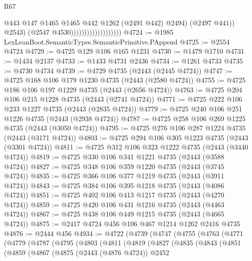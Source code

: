 \begin{lexlean}{R67}
\begin{coremodule}
                                              @443
                                              @147
                                              @1465
                                              @1465
                                              @442
                                              @1262
                                              (@2491 @442)
                                              @2494)
                                            (@2497 @441))
                                          @2543)
                                        (@2547 @4530)))))))))))))))))))
@4724 := @1985 LexLeanBoot.SemanticTypes.SemanticPrimitive.PAppend
@4725 := @2554 @4724
@4729 := @4725 @129 @106 @165 @1231
@4730 := @1479 @1710
@4731 := @1434 @2137
@4733 := @1433 @4731 @2436
@4734 := @1261 @4733
@4735 := @4730 @4734
@4739 := @4729 @4735 (@2443 (@2445 @4724))
@4747 := @4725 @168 @106 @179 @1230 @4735 (@2443 (@2580 @4724))
@4755 := @4725 @186 @106 @197 @1229 @4735 (@2443 (@2656 @4724))
@4763 := @4725 @204 @106 @215 @1228 @4735 (@2443 (@2741 @4724))
@4771 := @4725 @222 @106 @233 @1227 @4735 (@2443 (@2835 @4724))
@4779 := @4725 @240 @106 @251 @1226 @4735 (@2443 (@2938 @4724))
@4787 := @4725 @258 @106 @269 @1225 @4735 (@2443 (@3050 @4724))
@4795 := @4725 @276 @106 @287 @1224 @4735 (@2443 (@3171 @4724))
@4803 := @4725 @294 @106 @305 @1223 @4735 (@2443 (@3301 @4724))
@4811 := @4725 @312 @106 @323 @1222 @4735 (@2443 (@3440 @4724))
@4819 := @4725 @330 @106 @341 @1221 @4735 (@2443 (@3588 @4724))
@4827 := @4725 @348 @106 @359 @1220 @4735 (@2443 (@3745 @4724))
@4835 := @4725 @366 @106 @377 @1219 @4735 (@2443 (@3911 @4724))
@4843 := @4725 @384 @106 @395 @1218 @4735 (@2443 (@4086 @4724))
@4851 := @4725 @402 @106 @413 @1217 @4735 (@2443 (@4270 @4724))
@4859 := @4725 @420 @106 @431 @1216 @4735 (@2443 (@4463 @4724))
@4867 := @4725 @438 @106 @449 @1215 @4735 (@2443 (@4665 @4724))
@4875 := @2417 @4724 @456 @106 @467 @1214 @1262 @2416 @4735
@4876 := @2444 @456
@4934 := @4722
    (@4739
      (@4747
        (@4755
          (@4763
            (@4771
              (@4779
                (@4787
                  (@4795
                    (@4803
                      (@4811
                        (@4819
                          (@4827
                            (@4835
                              (@4843
                                (@4851
                                  (@4859
                                    (@4867
                                      (@4875
                                        (@2443 (@4876 @4724))
                                        @2452

\end{coremodule}
\end{lexlean}
